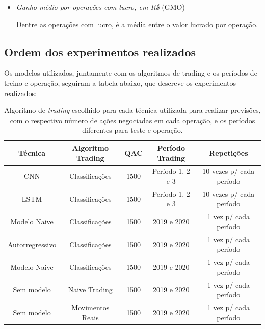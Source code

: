 \begin{itemize}
\item{\textit{Ganho médio por operações com lucro, em R\$} (GMO) \par
Dentre as operações com lucro, é a média entre o valor lucrado por operação.}
\end{itemize}


\subsection{\textbf{Ordem dos experimentos realizados}}

\par
Os modelos utilizados, juntamente com os algoritmos de trading e os períodos de treino e operação, seguiram a tabela abaixo, que descreve os experimentos realizados:


\begin{table}[htp]
\footnotesize
\centering
\caption{Algoritmo de \textit{trading} escolhido para cada técnica utilizada para realizar previsões, com o respectivo número de ações negociadas em cada operação, e os períodos diferentes para teste e operação.}
\begin{tabular}{ccccc}
\hline
\textbf{Técnica} & \textbf{Algoritmo   Trading} & \textbf{QAC} & \textbf{Período   Trading} & \textbf{Repetições} \\ \hline
CNN & Classificações & 1500 & Período   1, 2 e 3 & 10   vezes p/ cada período \\
LSTM & Classificações & 1500 & Período   1, 2 e 3 & 10   vezes p/ cada período \\
Modelo   Naive & Classificações & 1500 & 2019   e 2020 & 1   vez p/ cada período \\
Autorregressivo & Classificações & 1500 & 2019   e 2020 & 1   vez p/ cada período \\
Modelo   Naive & Classificações & 1500 & 2019   e 2020 & 1   vez p/ cada período \\
Sem   modelo & Naive   Trading & 1500 & 2019   e 2020 & 1   vez p/ cada período \\
Sem   modelo & Movimentos   Reais & 1500 & 2019   e 2020 & 1 vez p/ cada período \\ \hline
\end{tabular}
\end{table}


